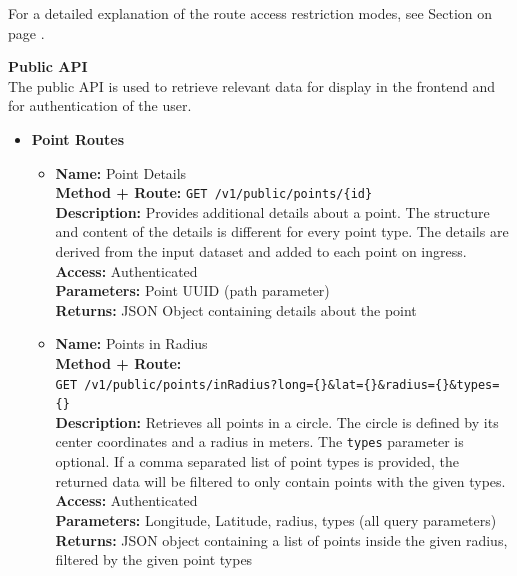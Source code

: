 For a detailed explanation of the route access restriction modes, see Section
\textbf{} on page
\pageref{middleware_route_authorisation}.

\newpage{}

\textbf{Public API}\\
The public API is used to retrieve relevant data for display in the frontend and
for authentication of the user.

\begin{itemize}
  \item{
    \textbf{Point Routes}
    \begin{itemize}
      \item { \textbf{Name:} Point Details\\
          \textbf{Method + Route:} \texttt{GET /v1/public/points/\{id\}}\\
          \textbf{Description:} Provides additional details about a point. The
          structure and content of the details is different for every point
          type. The details are derived from the input dataset and added to each
          point on ingress.\\
          \textbf{Access:} Authenticated\\
          \textbf{Parameters:} Point UUID (path parameter)\\
          \textbf{Returns:} JSON Object containing details about the point\\
        }
      \item { \textbf{Name:} Points in Radius\\
          \textbf{Method + Route:}\\\texttt{GET
          /v1/public/points/inRadius?long=\{\}\&lat=\{\}\&radius=\{\}\&types=\{\}}\\
          \textbf{Description:} Retrieves all points in a circle. The circle is
          defined by its center coordinates and a radius in meters. The
          \texttt{types} parameter is optional. If a comma separated list of
          point types is provided, the returned data will be filtered to only
          contain points with the given types.\\
          \textbf{Access:} Authenticated\\
          \textbf{Parameters:} Longitude, Latitude, radius, types (all query
          parameters)\\
          \textbf{Returns:} JSON object containing a list of points inside the
          given radius, filtered by the given point types\\
}
\end{itemize}}
\end{itemize}
